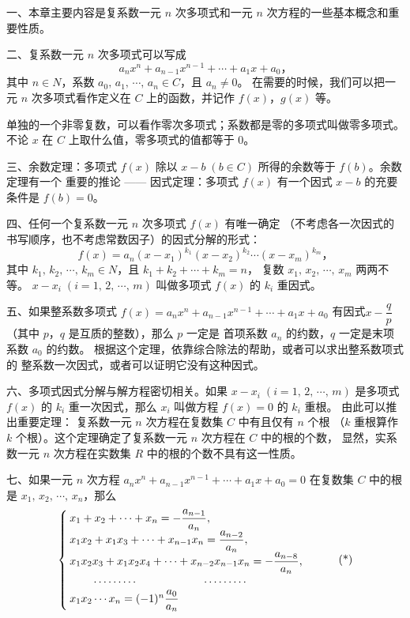 \xiaojie

一、本章主要内容是复系数一元 $n$ 次多项式和一元 $n$ 次方程的一些基本概念和重要性质。


二、复系数一元 $n$ 次多项式可以写成
$$ a_n x^n + a_{n-1}x^{n-1} + \cdots + a_1x + a_0 \text{，} $$
其中 $n \in N$，系数 $a_0,\, a_1,\, \cdots,\, a_n \in C$，且 $a_n \neq 0$。
在需要的时候，我们可以把一元 $n$ 次多项式看作定义在 $C$ 上的函数，并记作 $f(x)$，$g(x)$ 等。

单独的一个非零复数，可以看作零次多项式；系数都是零的多项式叫做零多项式。
不论 $x$ 在 $C$ 上取什么值，零多项式的值都等于 $0$。


三、余数定理：多项式 $f(x)$ 除以 $x - b\; (b \in C)$ 所得的余数等于 $f(b)$。余数定理有一个
重要的推论 —— 因式定理：多项式 $f(x)$ 有一个因式 $x - b$ 的充要条件是 $f(b) = 0$。


四、任何一个复系数一元 $n$ 次多项式 $f(x)$ 有唯一确定
（不考虑各一次因式的书写顺序，也不考虑常数因子）的因式分解的形式：
$$ f(x) = a_n(x - x_1)^{k_1} (x - x_2)^{k_2} \cdots (x - x_m)^{k_m} \text{，} $$
其中 $k_1,\, k_2,\, \cdots,\, k_m \in N$，且 $k_1 + k_2 + \cdots + k_m = n$，
复数 $x_1,\, x_2,\, \cdots,\, x_m$ 两两不等。
$x - x_i \; (i = 1,\, 2,\, \cdots,\, m)$ 叫做多项式 $f(x)$ 的 $k_i$ 重因式。


五、如果整系数多项式
$f(x) = a_n x^n + a_{n-1}x^{n-1} + \cdots + a_1x + a_0$
有因式$x - \dfrac{q}{p}$（其中 $p$，$q$ 是互质的整数），那么 $p$ 一定是
首项系数 $a_n$ 的约数，$q$ 一定是末项系数 $a_0$ 的约数。
根据这个定理，依靠综合除法的帮助，或者可以求出整系数项式的
整系数一次因式，或者可以证明它没有这种因式。


六、多项式因式分解与解方程密切相关。如果 $x - x_i \; (i = 1,\, 2,\, \cdots,\, m)$
是多项式 $f(x)$ 的 $k_i$ 重一次因式，那么 $x_i$ 叫做方程 $f(x) = 0$ 的 $k_i$ 重根。
由此可以推出重要定理： 复系数一元 $n$ 次方程在复数集 $C$ 中有且仅有 $n$ 个根
（$k$ 重根算作 $k$ 个根）。这个定理确定了复系数一元 $n$ 次方程在 $C$ 中的根的个数，
显然，实系数一元 $n$ 次方程在实数集 $R$ 中的根的个数不具有这一性质。


七、如果一元 $n$ 次方程 $a_n x^n + a_{n-1}x^{n-1} + \cdots + a_1x + a_0 = 0$
在复数集 $C$ 中的根是 $x_1,\, x_2,\, \cdots,\, x_n$，那么
\begin{equation}
    \begin{cases}
        x_1 + x_2 + \cdots + x_n = -\dfrac{a_{n-1}}{a_n}, \\
        x_1 x_2 + x_1 x_3 + \cdots + x_{n-1} x_n = \dfrac{a_{n-2}}{a_n}, \\
        x_1 x_2 x_3 + x_1 x_2 x_4 + \cdots + x_{n-2} x_{n-1} x_n = -\dfrac{a_{n-8}}{a_n}, \\
        \rule{2em}{0pt} \cdots \cdots \cdots  \hspace{6em} \cdots \cdots \cdots \\
        x_1 x_2 \cdots x_n = (-1)^n \dfrac{a_0}{a_n}
    \end{cases} \tag{*}
\end{equation}

